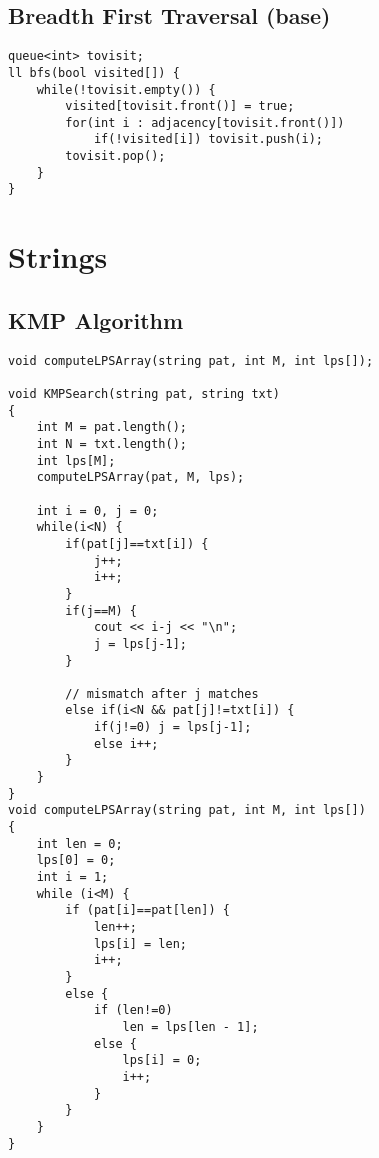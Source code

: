 \documentclass{article}
\begin{document}
        \subsection{Breadth First Traversal (base)}


        \begin{lstlisting}
queue<int> tovisit;
ll bfs(bool visited[]) {
    while(!tovisit.empty()) {
        visited[tovisit.front()] = true;
        for(int i : adjacency[tovisit.front()])
            if(!visited[i]) tovisit.push(i);
        tovisit.pop();
    }
}       \end{lstlisting}

    \section{Strings}
        \subsection{KMP Algorithm}
        

        \begin{lstlisting}
void computeLPSArray(string pat, int M, int lps[]);

void KMPSearch(string pat, string txt)
{
    int M = pat.length();
    int N = txt.length();
    int lps[M];
    computeLPSArray(pat, M, lps);
    
    int i = 0, j = 0;
    while(i<N) {
        if(pat[j]==txt[i]) {
            j++;
            i++;
        }
        if(j==M) {
            cout << i-j << "\n";
            j = lps[j-1];
        }
    
        // mismatch after j matches
        else if(i<N && pat[j]!=txt[i]) {
            if(j!=0) j = lps[j-1];
            else i++;
        }
    }
}
void computeLPSArray(string pat, int M, int lps[])
{
    int len = 0;
    lps[0] = 0;
    int i = 1;
    while (i<M) {
        if (pat[i]==pat[len]) {
            len++;
            lps[i] = len;
            i++;
        }
        else {
            if (len!=0)
                len = lps[len - 1];
            else {
                lps[i] = 0;
                i++;
            }
        }
    }
}\end{lstlisting}
\end{document}
